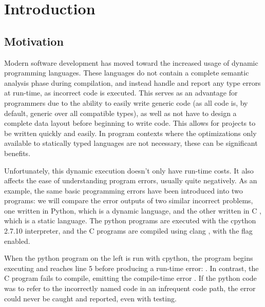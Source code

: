 \glsresetall %
\chapter{Introduction}\label{ch:Introduction}

\section{Motivation}

Modern software development has moved toward the increased usage of dynamic
programming languages. These languages do not contain a complete semantic
analysis phase during compilation, and instead handle and report any type errors
at run-time, as incorrect code is executed. This serves as an advantage for
programmers due to the ability to easily write generic code (as all code is, by
default, generic over all compatible types), as well as not have to design a
complete data layout before beginning to write code. This allows for projects to
be written quickly and easily. In program contexts where the optimizations only
available to statically typed languages are not necessary, these can be
significant benefits.

Unfortunately, this dynamic execution doesn't only have run-time costs. It also
affects the ease of understanding program errors, usually quite negatively. As
an example, the same basic programming errors have been introduced into two
programs: we will compare the error outputs of two similar incorrect problems,
one written in Python, which is a dynamic language, and the other written in
C \cite{ansic}, which is a static language. The python programs are executed
with the cpython 2.7.10 \cite{cpython} interpreter, and the C programs are
compiled using clang \cite{clangweb}, with the  flag enabled.

\begin{minipage}[t]{0.5\textwidth}

\end{minipage}
\begin{minipage}[t]{0.5\textwidth}

\end{minipage}

When the python program on the left is run with cpython, the program begins
executing and reaches line 5 before producing a run-time error: . In contrast, the C program fails to compile, emitting
the compile-time error . If the
python code was to refer to the incorrectly named code in an infrequent code
path, the error could never be caught and reported, even with testing.

